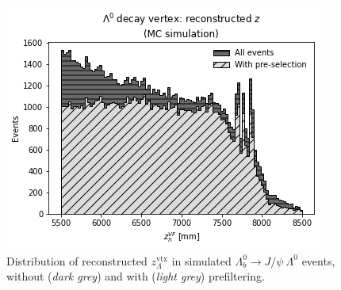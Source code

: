 \begin{figure}[t]
	\centering
	\includegraphics[width=.6\textwidth]{graphics/04-event_selection/Lambda_endvertex_z.png}
	\caption[Z.]{Distribution of reconstructed $z_\Lambda^\text{vtx}$ in simulated $\Lambda_b^0 \rightarrow J/\psi~\Lambda^0$ events, without (\textit{dark grey}) and with (\textit{light grey}) prefiltering.}
\end{figure}


